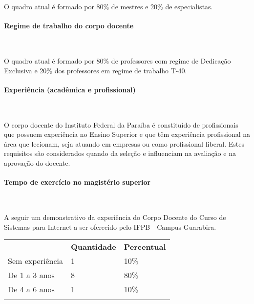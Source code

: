 	O quadro atual \'e formado por 80\% de mestres e 20\% de especialistas.

\paragraph{Regime de trabalho do corpo docente}\

	O quadro atual \'e formado por 80\% de professores com regime de Dedica\c{c}\~ao Exclusiva e 20\% dos professores em regime de trabalho T-40.

\paragraph{Experi\^encia (acad\^emica e profissional)}\

	O corpo docente do Instituto Federal da Paraíba é constituído de profissionais que possuem experiência no Ensino Superior e que têm experiência profissional na área que lecionam, seja atuando em empresas ou como profissional liberal. Estes requisitos são considerados quando da seleção e influenciam na avaliação e na aprovação do docente.

\paragraph{Tempo de exercício no magistério superior}\

A seguir um demonstrativo da experiência do Corpo Docente do Curso de Sistemas para Internet a ser oferecido pelo IFPB - Campus Guarabira.

\begin{table}[h!]
\begin{tabular}{lll}
\rowcolor[HTML]{C0C0C0} 
\multicolumn{1}{c}{\cellcolor[HTML]{C0C0C0}\textbf{Experiência no Magistério Superior}} & \multicolumn{1}{c}{\cellcolor[HTML]{C0C0C0}\textbf{Quantidade}} & \multicolumn{1}{c}{\cellcolor[HTML]{C0C0C0}\textbf{Percentual}} \\
Sem experiência                                                                         & 1                                                               & 10\%                                                            \\
De 1 a 3 anos                                                                           & 8                                                               & 80\%                                                            \\
De 4 a 6 anos                                                                           & 1                                                               & 10\%                                                            \\
\rowcolor[HTML]{9B9B9B} 
\multicolumn{3}{l}{\cellcolor[HTML]{9B9B9B}}                                                                                                                                                                               
\end{tabular}
\end{table}

